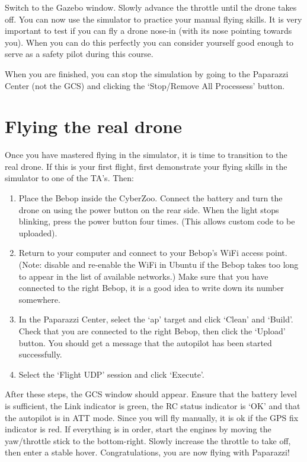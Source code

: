 \documentclass{article}
\begin{document}
Switch to the Gazebo window. Slowly advance the throttle until the drone takes off.
You can now use the simulator to practice your manual flying skills. It is very important to test if you can fly a drone nose-in (with its nose pointing towards you). When you can do this perfectly you can consider yourself good enough to serve as a safety pilot during this course.

When you are finished, you can stop the simulation by going to the Paparazzi Center (not the GCS) and clicking the `Stop/Remove All Processess' button.



\section{Flying the real drone}
Once you have mastered flying in the simulator, it is time to transition to the real drone.
If this is your first flight, first demonstrate your flying skills in the simulator to one of the TA's.
Then:

\begin{enumerate}
\item Place the Bebop inside the CyberZoo. Connect the battery and turn the drone on using the power button on the rear side. When the light stops blinking, press the power button four times. (This allows custom code to be uploaded).
\item Return to your computer and connect to your Bebop's WiFi access point. (Note: disable and re-enable the WiFi in Ubuntu if the Bebop takes too long to appear in the list of available networks.)
Make sure that you have connected to the right Bebop, it is a good idea to write down its number somewhere.
\item In the Paparazzi Center, select the `ap' target and click `Clean' and `Build'. Check that you are connected to the right Bebop, then click the `Upload' button. You should get a message that the autopilot has been started successfully.
\item Select the `Flight UDP' session and click `Execute'.
\end{enumerate}

After these steps, the GCS window should appear.
Ensure that the battery level is sufficient, the Link indicator is green, the RC status indicator is `OK' and that the autopilot is in ATT mode. Since you will fly manually, it is ok if the GPS fix indicator is red.
If everything is in order, start the engines by moving the yaw/throttle stick to the bottom-right. Slowly increase the throttle to take off, then enter a stable hover. Congratulations, you are now flying with Paparazzi!
\end{document}
